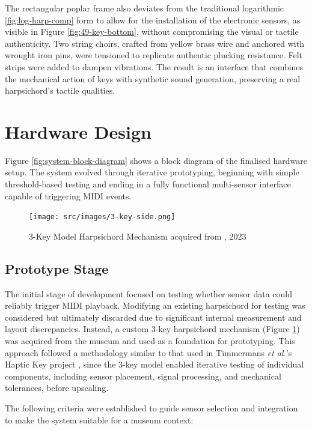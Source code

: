 The rectangular poplar frame also deviates from the traditional logarithmic \ref{fig:log-harp-comp} form to allow for the installation of the electronic sensors, as visible in Figure \ref{fig:49-key-bottom}, without compromising the visual or tactile authenticity. Two string choirs, crafted from yellow brass wire and anchored with wrought iron pins, were tensioned to replicate authentic plucking resistance. Felt strips were added to dampen vibrations. The result is an interface that combines the mechanical action of keys with synthetic sound generation, preserving a real harpsichord's tactile qualities.

\section{Hardware Design}\label{hardware-design}

Figure \ref{fig:system-block-diagram} shows a block diagram of the finalised hardware setup. The system evolved through iterative prototyping, beginning with simple threshold-based testing and ending in a fully functional multi-sensor interface capable of triggering MIDI events. 

\begin{figure}
    \centering    
    \texttt{[image: src/images/3-key-side.png]}
    \caption{3-Key Model Harpsichord Mechanism acquired from , 2023}
    \label{fig:3key}
\end{figure}

\subsection{Prototype Stage}

The initial stage of development focused on testing whether sensor data could reliably trigger MIDI playback. Modifying an existing harpsichord for testing was considered but ultimately discarded due to significant internal measurement and layout discrepancies. Instead, a custom 3-key harpsichord mechanism (Figure \ref{fig:3key}) was acquired from the museum and used as a foundation for prototyping. This approach followed a methodology similar to that used in Timmermans \emph{et al.}'s Haptic Key project \cite{Timmermans2020}, since the 3-key model enabled iterative testing of individual components, including sensor placement, signal processing, and mechanical tolerances, before upscaling. 

The following criteria were established to guide sensor selection and integration to make the system suitable for a museum context:

